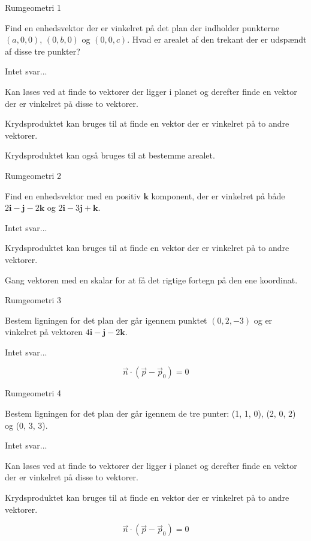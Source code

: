 \documentclass{article}
\begin{document}
\begin{exercise}{Rumgeometri 1}

Find en enhedsvektor der er vinkelret på det plan
der indholder punkterne $(a, 0, 0)$, $(0, b, 0)$ og
$(0, 0, c)$.
Hvad er arealet af den trekant der er udspændt af
disse tre punkter?

Intet svar...

\hint
Kan løses ved at finde to vektorer der ligger i planet
og derefter finde en vektor der er vinkelret på
disse to vektorer.

\hint
Krydsproduktet kan bruges til at finde en vektor der
er vinkelret på to andre vektorer.

\hint
Krydsproduktet kan også bruges til at bestemme arealet.

\end{exercise}


\begin{exercise}{Rumgeometri 2}

Find en enhedsvektor med en positiv $\mathbf{k}$ komponent,
der er vinkelret på både
$2 \mathbf{i} - \mathbf{j} - 2 \mathbf{k}$
og
$2 \mathbf{i} - 3\mathbf{j} + \mathbf{k}$.

Intet svar...

\hint
Krydsproduktet kan bruges til at finde en vektor der
er vinkelret på to andre vektorer.

\hint
Gang vektoren med en skalar for at få det rigtige fortegn
på den ene koordinat.

\end{exercise}


\begin{exercise}{Rumgeometri 3}

Bestem ligningen for det plan der går igennem
punktet $(0, 2, -3)$ og er vinkelret på vektoren
$4 \mathbf{i} - \mathbf{j} - 2 \mathbf{k}$.

Intet svar...

\hint
\[
\vec{n} \cdot \left( \vec{p} - \vec{p}_0 \right) = 0
\]

\end{exercise}


\begin{exercise}{Rumgeometri 4}

Bestem ligningen for det plan der går igennem
de tre punter: (1, 1, 0), (2, 0, 2) og (0, 3, 3).

Intet svar...

\hint
Kan løses ved at finde to vektorer der ligger i planet
og derefter finde en vektor der er vinkelret på
disse to vektorer.

\hint
Krydsproduktet kan bruges til at finde en vektor der
er vinkelret på to andre vektorer.

\hint
\[
\vec{n} \cdot \left( \vec{p} - \vec{p}_0 \right) = 0
\]


\end{exercise}
\end{document}
